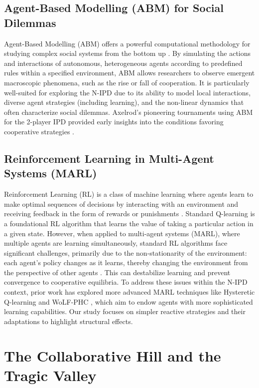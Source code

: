 \documentclass[]{llncs} %
\begin{document}
\subsection{Agent-Based Modelling (ABM) for Social Dilemmas}
Agent-Based Modelling (ABM) offers a powerful computational methodology for studying complex social systems from the bottom up \cite{Gilbert2007, Macal2010}. 
By simulating the actions and interactions of autonomous, heterogeneous agents according to predefined rules within a specified environment, ABM allows researchers to observe emergent macroscopic phenomena, such as the rise or fall of cooperation. It is particularly well-suited for exploring the N-IPD due to its ability to model local interactions, diverse agent strategies (including learning), and the non-linear dynamics that often characterize social dilemmas. Axelrod's pioneering tournaments using ABM for the 2-player IPD provided early insights into the conditions favoring cooperative strategies \cite{Axelrod}.

\subsection{Reinforcement Learning in Multi-Agent Systems (MARL)}
Reinforcement Learning (RL) is a class of machine learning where agents learn to make optimal sequences of decisions by interacting with an environment and receiving feedback in the form of rewards or punishments \cite{SuttonBarto2018}. 
Standard Q-learning is a foundational RL algorithm that learns the value of taking a particular action in a given state. However, when applied to multi-agent systems (MARL), where multiple agents are learning simultaneously, standard RL algorithms face significant challenges, primarily due to the non-stationarity of the environment: each agent's policy changes as it learns, thereby changing the environment from the perspective of other agents \cite{Busoniu2008}. 
This can destabilize learning and prevent convergence to cooperative equilibria. To address these issues within the N-IPD context, prior work has explored more advanced MARL techniques like Hysteretic Q-learning \cite{Matignon2007Hysteretic} and WoLF-PHC \cite{Bowling2002WoLF}, which aim to endow agents with more sophisticated learning capabilities. Our study focuses on simpler reactive strategies and their adaptations to highlight structural effects.



\section{The Collaborative Hill and the Tragic Valley}
\label{sec:tragicValley}
\end{document}
